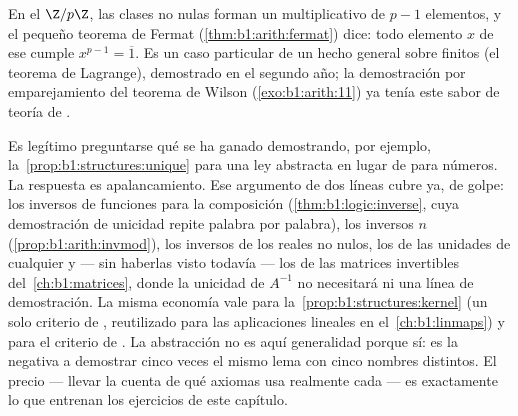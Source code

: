 \begin{remark}
En el  $\Z/p\Z$, las clases no nulas forman un 
multiplicativo de $p - 1$ elementos, y el pequeño teorema de Fermat
(\cref{thm:b1:arith:fermat}) dice: todo elemento $x$ de ese 
cumple $x^{p-1} = \overline 1$. Es un caso particular de un hecho
general sobre  finitos (el teorema de Lagrange), demostrado en
el segundo año; la demostración por emparejamiento del teorema de
Wilson (\cref{exo:b1:arith:11}) ya tenía este sabor de teoría de .
\end{remark}

\begin{remark}\label{rem:b1:structures:interlude}
Es legítimo preguntarse qué se ha ganado demostrando, por ejemplo,
la~\cref{prop:b1:structures:unique} para una ley abstracta en lugar de
para números. La respuesta es apalancamiento. Ese argumento de dos
líneas cubre ya, de golpe: los inversos de funciones para la
composición (\cref{thm:b1:logic:inverse}, cuya demostración de unicidad
repite palabra por palabra), los inversos  $n$
(\cref{prop:b1:arith:invmod}), los inversos de los reales no nulos, los
de las unidades de cualquier  y --- sin haberlas visto todavía
--- los de las matrices invertibles del~\cref{ch:b1:matrices}, donde la
unicidad de $A^{-1}$ no necesitará ni una línea de demostración. La
misma economía vale para la~\cref{prop:b1:structures:kernel} (un solo
criterio de , reutilizado para las aplicaciones lineales en
el~\cref{ch:b1:linmaps}) y para el criterio de . La
abstracción no es aquí generalidad porque sí: es la negativa a
demostrar cinco veces el mismo lema con cinco nombres distintos. El
precio --- llevar la cuenta de qué axiomas usa realmente cada
 --- es exactamente lo que entrenan los ejercicios de este
capítulo.
\end{remark}

